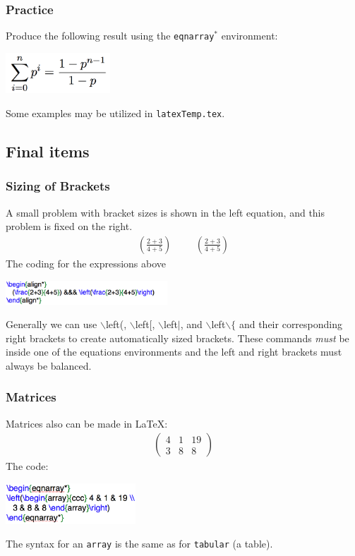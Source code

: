 \begin{frame} \frametitle{Practice}
	Produce the following result using the \texttt{\color{highlight}eqnarray$^*$} environment:
	\begin{center}
		\includegraphics[height=0.6in]{math/images/tryIt3}
	\end{center}
	Some examples may be utilized in \texttt{\color{highlight}latexTemp.tex}.
\end{frame}

\subsection[Final items]{Final items}
\begin{frame} \frametitle{Sizing of Brackets}
	A small problem with bracket sizes is shown in the left equation, and this problem is fixed on the right.
	\begin{align*}
	(\frac{2+3}{4+5}) &&& \left(\frac{2+3}{4+5}\right)
	\end{align*}
	The coding for the expressions above 
	\begin{center}
		\includegraphics[height=9mm]{math/images/fixingParentheses}
	\end{center}
	Generally we can use {\color{command}$\backslash$left\color{black}(}, {\color{command}$\backslash$left\color{black}[}, {\color{command}$\backslash$left\color{black}$|$}, and {\color{command}$\backslash$left$\backslash\{$} and their corresponding right brackets to create automatically sized brackets. These commands \emph{must} be inside one of the equations environments and the left and right brackets must always be balanced.
\end{frame}

\begin{frame} \frametitle{Matrices}
	Matrices also can be made in LaTeX:
	\begin{eqnarray*}
		\left(\begin{array}{ccc} 4 & 1 & 19 \\ 3 & 8 & 8\end{array}\right)
	\end{eqnarray*}
	The code:
	\begin{center}
		\includegraphics[height=0.6in]{math/images/array}
	\end{center}
	The syntax for an \texttt{\color{highlight}array} is the same as for \texttt{\color{highlight}tabular} (a table).
\end{frame}

